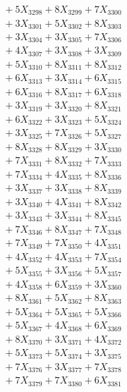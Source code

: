\documentclass[a4paper,10pt]{article}
\begin{document}
{\begin{align}
&\;  + 5 X_{3298} + 8 X_{3299} + 7 X_{3300} \\[0.3ex]
&\;  + 3 X_{3301} + 5 X_{3302} + 8 X_{3303} \\[0.3ex]
&\;  + 3 X_{3304} + 3 X_{3305} + 7 X_{3306} \\[0.3ex]
&\;  + 4 X_{3307} + 3 X_{3308} + 3 X_{3309} \\[0.5ex]\allowbreak
&\;  + 5 X_{3310} + 8 X_{3311} + 8 X_{3312} \\[0.3ex]
&\;  + 6 X_{3313} + 3 X_{3314} + 6 X_{3315} \\[0.3ex]
&\;  + 6 X_{3316} + 8 X_{3317} + 6 X_{3318} \\[0.3ex]
&\;  + 3 X_{3319} + 3 X_{3320} + 8 X_{3321} \\[0.3ex]
&\;  + 6 X_{3322} + 3 X_{3323} + 5 X_{3324} \\[0.3ex]
&\;  + 3 X_{3325} + 7 X_{3326} + 5 X_{3327} \\[0.3ex]
&\;  + 8 X_{3328} + 8 X_{3329} + 3 X_{3330} \\[0.3ex]
&\;  + 7 X_{3331} + 8 X_{3332} + 7 X_{3333} \\[0.3ex]
&\;  + 7 X_{3334} + 4 X_{3335} + 8 X_{3336} \\[0.3ex]
&\;  + 3 X_{3337} + 3 X_{3338} + 8 X_{3339} \\[0.5ex]\allowbreak
&\;  + 3 X_{3340} + 4 X_{3341} + 8 X_{3342} \\[0.3ex]
&\;  + 3 X_{3343} + 3 X_{3344} + 8 X_{3345} \\[0.3ex]
&\;  + 7 X_{3346} + 8 X_{3347} + 7 X_{3348} \\[0.3ex]
&\;  + 7 X_{3349} + 7 X_{3350} + 4 X_{3351} \\[0.3ex]
&\;  + 4 X_{3352} + 4 X_{3353} + 7 X_{3354} \\[0.3ex]
&\;  + 5 X_{3355} + 3 X_{3356} + 5 X_{3357} \\[0.3ex]
&\;  + 4 X_{3358} + 6 X_{3359} + 3 X_{3360} \\[0.3ex]
&\;  + 8 X_{3361} + 5 X_{3362} + 8 X_{3363} \\[0.3ex]
&\;  + 5 X_{3364} + 5 X_{3365} + 5 X_{3366} \\[0.3ex]
&\;  + 5 X_{3367} + 4 X_{3368} + 6 X_{3369} \\[0.5ex]\allowbreak
&\;  + 8 X_{3370} + 3 X_{3371} + 4 X_{3372} \\[0.3ex]
&\;  + 5 X_{3373} + 5 X_{3374} + 3 X_{3375} \\[0.3ex]
&\;  + 7 X_{3376} + 3 X_{3377} + 7 X_{3378} \\[0.3ex]
&\;  + 7 X_{3379} + 7 X_{3380} + 6 X_{3381} \\[0.3ex]

\end{align}}
\end{document}
